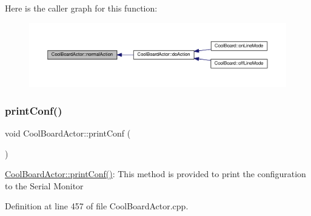 Here is the caller graph for this function\+:\nopagebreak
\begin{figure}[H]
\begin{center}
\leavevmode
\includegraphics[width=350pt]{dc/d69/class_cool_board_actor_a81229abf5895f4d3b0355050b822b438_icgraph}
\end{center}
\end{figure}
\mbox{\label{class_cool_board_actor_aabb10e7aebc3249ffc940530de29f84a}} 
\subsubsection{\texorpdfstring{print\+Conf()}{printConf()}}
{\footnotesize\ttfamily void Cool\+Board\+Actor\+::print\+Conf (\begin{DoxyParamCaption}{ }\end{DoxyParamCaption})}

\hyperlink{class_cool_board_actor_aabb10e7aebc3249ffc940530de29f84a}{Cool\+Board\+Actor\+::print\+Conf()}\+: This method is provided to print the configuration to the Serial Monitor 

Definition at line 457 of file Cool\+Board\+Actor.\+cpp.


